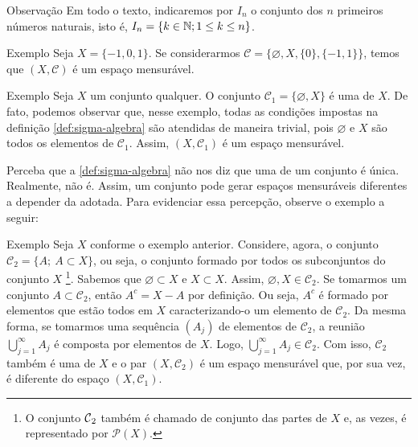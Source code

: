 \begin{env}{Observação}
	Em todo o texto, indicaremos por $I_n$ o conjunto dos $n$ primeiros números naturais, isto é, $I_n = \{k \in \operatorname{\mathbb{N}}; 1 \leq k \leq n\}$.
	\vspace{-0.2cm}
\end{env}
\begin{env}{Exemplo}
    Seja $X = \{-1,0,1\}$. Se considerarmos $\mathcal{C} = \{\varnothing, X, \{0\}, \{-1,1\}\}$, temos que $(X, \mathcal{C})$ é um espaço mensurável.
    \vspace{-0.2cm}
\end{env}
%
\begin{env}{Exemplo}
	\label{ex:sigma-trivial}
	Seja $X$ um conjunto qualquer.
	O conjunto $\mathcal{C}_1 = \{\varnothing, X\}$ é uma \sigal de $X$.
	De fato, podemos observar que, nesse exemplo, todas as condições impostas na definição \ref{def:sigma-algebra} são atendidas de maneira trivial, pois 
	$\varnothing$ e $X$ são todos os elementos de $\mathcal{C}_1$. 
	Assim,  $(X, \mathcal{C}_1)$ é um espaço mensurável.
\vspace{-0.2cm}
\end{env}

	Perceba que a \ref{def:sigma-algebra} não nos diz que uma \sigal de um conjunto é única.
Realmente, não é. 
Assim, um conjunto pode gerar espaços mensuráveis diferentes a depender da \sigal adotada.
Para evidenciar essa percepção, observe o exemplo a seguir:

\begin{env}{Exemplo}
	\label{ex:sigma-subconjuntos}
	Seja $X$ conforme o exemplo anterior.
	Considere, agora, o conjunto $\mathcal{C}_2 = \{ A; \ A \subset X\}$, ou seja, o conjunto formado por todos os subconjuntos do conjunto $X$
	\footnote{O conjunto $\operatorname{\mathcal{C}}_2$ também é chamado de conjunto das partes de $X$ e, as vezes, é representado por $\mathcal{P}(X)$.}.
	Sabemos que $\varnothing \subset X$ e $X \subset X$. 
	Assim, $\varnothing, X \in \mathcal{C}_2$. 
	Se tomarmos um conjunto $A \subset \mathcal{C}_2$, então $A^c = X - A$ por definição.
	Ou seja, $A^c$ é formado por elementos que estão todos em $X$ caracterizando-o um elemento de $\mathcal{C}_2$.
	Da mesma forma, se tomarmos uma sequência $(A_j)$ de elementos de $\mathcal{C}_2$, a reunião 
	$\displaystyle \bigcup_{j = 1}^\infty A_j$ é composta por elementos de $X$.
	Logo,  $\displaystyle \bigcup_{j = 1}^\infty A_j \in \mathcal{C}_2$.
	Com isso, $\mathcal{C}_2$ também é uma \sigal de $X$ e o par $(X, \mathcal{C}_2)$ é um espaço mensurável que, por sua vez, é diferente do espaço $(X,\mathcal{C}_1)$.
	\vspace{-0.2cm}
\end{env}

